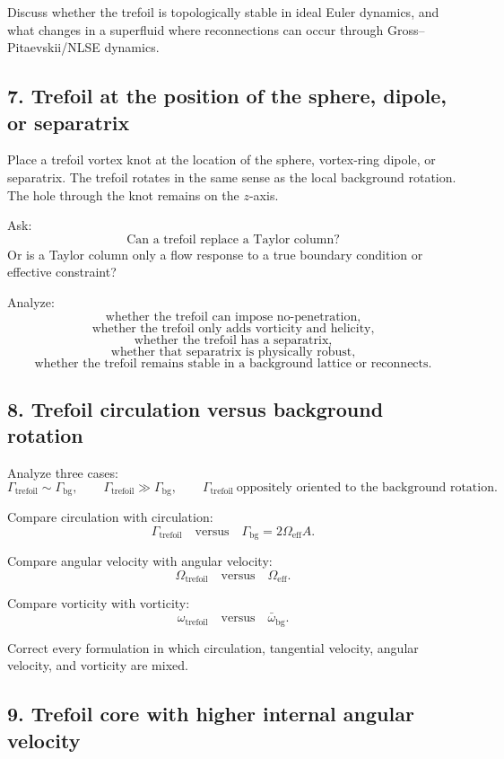 \documentclass[11pt,a4paper]{article}
\begin{document}
Discuss whether the trefoil is topologically stable in ideal Euler dynamics, and what changes in a superfluid where reconnections can occur through Gross--Pitaevskii/NLSE dynamics.

\subsection{7. Trefoil at the position of the sphere, dipole, or separatrix}

Place a trefoil vortex knot at the location of the sphere, vortex-ring dipole, or separatrix. The trefoil rotates in the same sense as the local background rotation. The hole through the knot remains on the \(z\)-axis.

Ask:
\[
\text{Can a trefoil replace a Taylor column?}
\]
Or is a Taylor column only a flow response to a true boundary condition or effective constraint?

Analyze:
\[
\text{whether the trefoil can impose no-penetration,}
\]
\[
\text{whether the trefoil only adds vorticity and helicity,}
\]
\[
\text{whether the trefoil has a separatrix,}
\]
\[
\text{whether that separatrix is physically robust,}
\]
\[
\text{whether the trefoil remains stable in a background lattice or reconnects.}
\]

\subsection{8. Trefoil circulation versus background rotation}

Analyze three cases:
\[
\Gamma_{\mathrm{trefoil}}\sim\Gamma_{\mathrm{bg}},
\qquad
\Gamma_{\mathrm{trefoil}}\gg\Gamma_{\mathrm{bg}},
\qquad
\Gamma_{\mathrm{trefoil}}\ \text{oppositely oriented to the background rotation}.
\]

Compare circulation with circulation:
\[
\Gamma_{\mathrm{trefoil}}
\quad\text{versus}\quad
\Gamma_{\mathrm{bg}}=2\Omega_{\mathrm{eff}}A.
\]

Compare angular velocity with angular velocity:
\[
\Omega_{\mathrm{trefoil}}
\quad\text{versus}\quad
\Omega_{\mathrm{eff}}.
\]

Compare vorticity with vorticity:
\[
\omega_{\mathrm{trefoil}}
\quad\text{versus}\quad
\bar{\omega}_{\mathrm{bg}}.
\]

Correct every formulation in which circulation, tangential velocity, angular velocity, and vorticity are mixed.

\subsection{9. Trefoil core with higher internal angular velocity}
\end{document}
